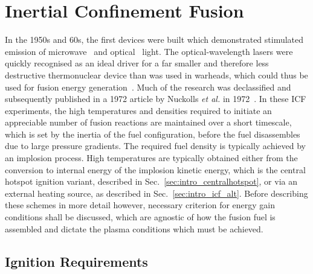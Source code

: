 \section{Inertial Confinement Fusion}%
\label{sec:intro_ICF}

In the 1950s and 60s, the first devices were built which demonstrated stimulated emission of microwave~\cite{schawlow_infrared_1958} and optical~\cite{maiman_stimulated_1960} light.
The optical-wavelength lasers were quickly recognised as an ideal driver for a far smaller and therefore less destructive thermonuclear device than was used in warheads, which could thus be used for fusion energy generation~\cite{nuckolls_early_1998}.
Much of the research was declassified and subsequently published in a 1972 article by Nuckolls \textit{et al.} in 1972~\cite{nuckolls_laser_1972}.
In these \ac{ICF} experiments, the high temperatures and densities required to initiate an appreciable number of fusion reactions are maintained over a short timescale, which is set by the inertia of the fuel configuration, before the fuel disassembles due to large pressure gradients.
The required fuel density is typically achieved by an implosion process.
High temperatures are typically obtained either from the conversion to internal energy of the implosion kinetic energy, which is the central hotspot ignition variant, described in Sec.~\ref{sec:intro_centralhotspot}, or via an external heating source, as described in Sec.~\ref{sec:intro_icf_alt}.
Before describing these schemes in more detail however, necessary criterion for energy gain conditions shall be discussed, which are agnostic of how the fusion fuel is assembled and dictate the plasma conditions which must be achieved.

\subsection{Ignition Requirements}%
\label{sec:intro_icf_ignition}

